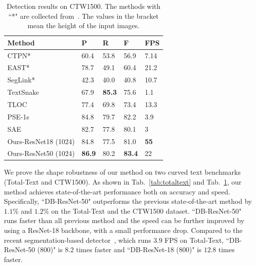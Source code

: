 \documentclass[letterpaper]{article} %
\newcommand{\minisection}[1]{\noindent{\textbf{#1}}}
\begin{document}
\begin{table}[!ht]
\centering
\caption{Detection results on CTW1500. The methods with ``*" are collected from~\cite{ctw1500}. The values in the bracket mean the height of the input images.}
\begin{tabularx}{1.0\linewidth}{@{}l*{4}X@{}}
\toprule
Method        & P             & R             & F             & FPS         \\ \midrule
CTPN*          & 60.4          & 53.8          & 56.9          & 7.14        \\ 
EAST*          & 78.7          & 49.1          & 60.4          & 21.2        \\ 
SegLink*       & 42.3            & 40.0            & 40.8            & 10.7         \\ 
TextSnake~\cite{long2018textsnake}     & 67.9          & \textbf{85.3}          & 75.6          & 1.1         \\ 
TLOC~\cite{ctw1500}     & 77.4            & 69.8          & 73.4          & 13.3           \\ 
PSE-1s~\cite{wang2019shape}    & 84.8         & 79.7          & 82.2          & 3.9         \\ 
SAE~\cite{tian2019learning}       & 82.7          & 77.8          & 80.1    & 3  \\ 
\midrule  
Ours-ResNet18 (1024) & 84.8          & 77.5          & 81.0          & \textbf{55} \\ 
Ours-ResNet50 (1024) & \textbf{86.9} & 80.2 & \textbf{83.4} & 22          \\ \bottomrule
\end{tabularx}
\label{tab:CTW}
\end{table}

\minisection{Curved text detection}
We prove the shape robustness of our method on two curved text benchmarks (Total-Text and CTW1500). As shown in Tab.~\ref{tab:totaltext} and Tab.~\ref{tab:CTW}, our method achieves state-of-the-art performance both on accuracy and speed.
Specifically, ``DB-ResNet-50" outperforms the previous state-of-the-art method by $1.1\%$ and $1.2\%$ on the Total-Text and the CTW1500 dataset.
``DB-ResNet-50" runs faster than all previous method and the speed can be further improved by using a ResNet-18 backbone, with a small performance drop.
Compared to the recent segmentation-based detector~\cite{wang2019shape}, which runs $3.9$ FPS on Total-Text, ``DB-ResNet-50 (800)" is $8.2$ times faster and ``DB-ResNet-18 (800)" is $12.8$ times faster.
\end{document}
